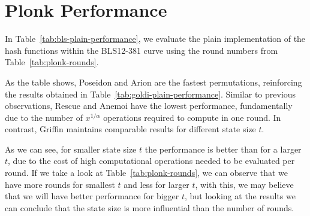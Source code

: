 \begin{table}[htbp]
  \centering
  \caption{Plonky2 performance comparasion.}
  \label{tab:plonky2-performance}
  \end{table}


\section{Plonk Performance}

In Table~\ref{tab:bls-plain-performance}, we evaluate the plain implementation of the hash functions within the BLS12-381 curve using the round numbers from Table~\ref{tab:plonk-rounds}.

As the table shows, Poseidon and Arion are the fastest permutations, reinforcing the results obtained in Table~\ref{tab:goldi-plain-performance}. Similar to previous observations, Rescue and Anemoi have the lowest performance, fundamentally due to the number of $x^{1/\alpha}$ operations required to compute in one round. In contrast, Griffin maintains comparable results for different state size $t$.

As we can see, for smaller state size $t$ the performance is better than for a larger $t$, due to the cost of high computational operations needed to be evaluated per round. If we take a look at Table~\ref{tab:plonk-rounds}, we can observe that we have more rounds for smallest $t$ and less for larger $t$, with this, we may believe that we will have better performance for bigger $t$, but looking at the results we can conclude that the state size is more influential than the number of rounds.

